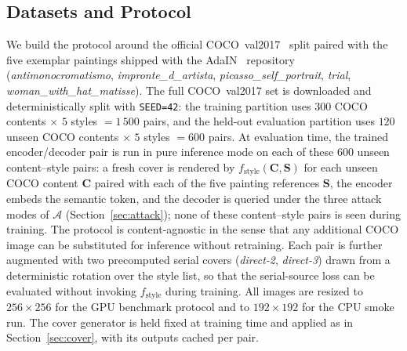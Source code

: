 \documentclass[runningheads]{llncs}
\begin{document}
\subsection{Datasets and Protocol}
\label{sec:proto}
We build the protocol around the official COCO~val2017~\cite{coco} split paired with the five exemplar paintings shipped with the AdaIN~\cite{adain} repository (\textit{antimonocromatismo}, \textit{impronte\_d\_artista}, \textit{picasso\_self\_portrait}, \textit{trial}, \textit{woman\_with\_hat\_matisse}). The full COCO~val2017 set is downloaded and deterministically split with \texttt{SEED=42}: the training partition uses $300$ COCO contents $\times$ $5$ styles $= 1\,500$ pairs, and the held-out evaluation partition uses $120$ unseen COCO contents $\times$ $5$ styles $= 600$ pairs. At evaluation time, the trained encoder/decoder pair is run in pure inference mode on each of these $600$ unseen content--style pairs: a fresh cover is rendered by $f_{\text{style}}(\mathbf{C},\mathbf{S})$ for each unseen COCO content $\mathbf{C}$ paired with each of the five painting references $\mathbf{S}$, the encoder embeds the semantic token, and the decoder is queried under the three attack modes of $\mathcal{A}$ (Section~\ref{sec:attack}); none of these content--style pairs is seen during training. The protocol is content-agnostic in the sense that any additional COCO image can be substituted for inference without retraining. Each pair is further augmented with two precomputed serial covers (\textit{direct-2}, \textit{direct-3}) drawn from a deterministic rotation over the style list, so that the serial-source loss can be evaluated without invoking $f_{\text{style}}$ during training. All images are resized to $256\!\times\!256$ for the GPU benchmark protocol and to $192\!\times\!192$ for the CPU smoke run. The cover generator is held fixed at training time and applied as in Section~\ref{sec:cover}, with its outputs cached per pair.
\end{document}
